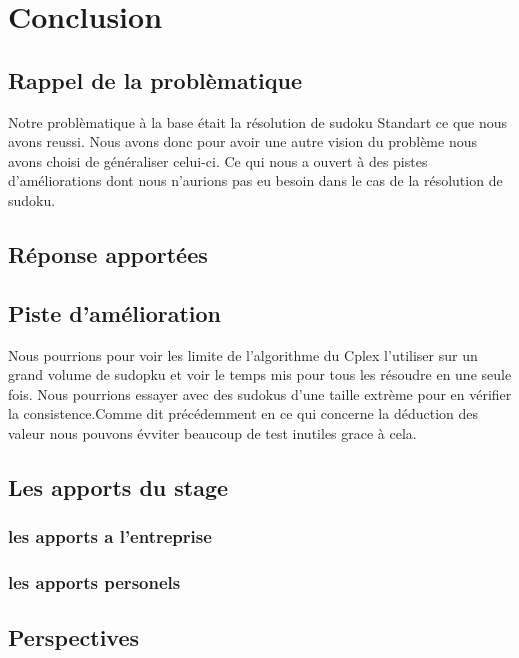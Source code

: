 \hypertarget{conclusion}{%
\chapter{Conclusion}\label{conclusion}}

\section{Rappel de la problèmatique}

Notre problèmatique à la base était la résolution de sudoku Standart ce que nous avons reussi. Nous avons donc pour avoir une autre vision du problème nous avons choisi de généraliser celui-ci. Ce qui nous a ouvert à des pistes d'améliorations dont nous n'aurions pas eu besoin dans le cas de la résolution de sudoku.

\section{Réponse apportées}

\section{Piste d'amélioration}
Nous pourrions pour voir les limite de l'algorithme du Cplex l'utiliser sur un grand volume de sudopku et voir le temps mis pour tous les résoudre en une seule fois. Nous pourrions essayer avec des sudokus d'une taille extrème pour en vérifier la consistence.\newline Comme dit précédemment en ce qui concerne la déduction des valeur nous pouvons évviter beaucoup de test inutiles grace à cela.

\section{Les apports du stage}

\subsection{les apports a l'entreprise}

\subsection{les apports personels}


\section{Perspectives}
